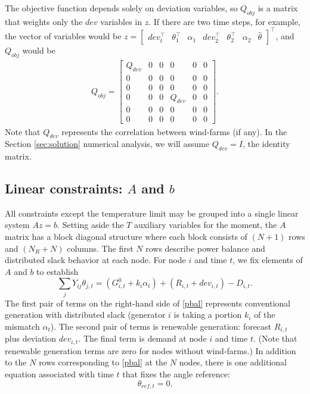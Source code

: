 \documentclass[conference]{IEEEtran}
\begin{document}
The objective function depends solely on deviation variables, so
$Q_{obj}$ is a matrix that weights only the $dev$ variables in $z$. If
there are two time steps, for example, the vector of variables would
be $z = \begin{bmatrix}dev_t^\top & \theta_1^\top & \alpha_1 &
  dev_2^\top & \theta_2^\top & \alpha_2 &
  \hat{\theta}\end{bmatrix}^\top$, and $Q_{obj}$ would be
\begin{align*}
Q_{obj} = \begin{bmatrix} Q_{dev} & 0 & 0 & 0 & 0 & 0 \\ 0 & 0 & 0 & 0 & 0 & 0 \\ 0 & 0  & 0 & 0 & 0 & 0 \\ 0 & 0 & 0 & Q_{dev} & 0 & 0 \\ 0 & 0 & 0 & 0 & 0 & 0 \\ 0 & 0 & 0 & 0 & 0 & 0\end{bmatrix}.
\end{align*}
Note that $Q_{dev}$ represents the correlation between wind-farms (if any). In the Section \ref{sec:solution} numerical analysis, we will assume $Q_{dev}=I$, the identity matrix.

\subsection{Linear constraints: $A$ and $b$}\label{sec:Ax=b}

All constraints except the temperature limit may be grouped into a single linear system $Az=b$. Setting aside the $T$ auxiliary variables for the moment, the $A$ matrix has a block diagonal structure where each block consists of $(N+1)$ rows and $(N_R+N)$ columns. The first $N$ rows describe power balance and distributed slack behavior at each node. For node $i$ and time $t$, we fix elements of $A$ and $b$ to establish
\begin{equation}\label{pbal}
\sum\limits_{j} Y_{ij}\theta_{j,t}  = (G_{i,t}^0 + k_i\alpha_t) +
(R_{i,t} + dev_{i,t}) - D_{i,t}.
\end{equation}
The first pair of terms on the right-hand side of \eqref{pbal}
represents conventional generation with distributed slack (generator
$i$ is taking a portion $k_i$ of the mismatch $\alpha_t$). The second
pair of terms is renewable generation: forecast $R_{i,t}$ plus
deviation $dev_{i,t}$. The final term is demand at node $i$ and time
$t$. (Note that renewable generation terms are zero for nodes without
wind-farms.) In addition to the $N$ rows corresponding to \eqref{pbal}
at the $N$ nodes, there is one additional equation associated with
time $t$ that fixes the angle reference:
\begin{equation}\label{mismatch}
\theta_{ref,t} = 0.
\end{equation}
\end{document}
